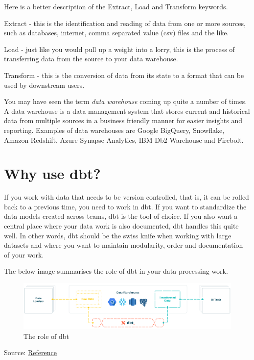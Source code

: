 \documentclass[
]{book}
\begin{document}
Here is a better description of the Extract, Load and Transform keywords.

Extract - this is the identification and reading of data from one or more sources, such as databases, internet, comma separated value (csv) files and the like.

Load - just like you would pull up a weight into a lorry, this is the process of transferring data from the source to your data warehouse.

Transform - this is the conversion of data from its state to a format that can be used by downstream users.

You may have seen the term \emph{data warehouse} coming up quite a number of times. A data warehouse is a data management system that stores current and historical data from multiple sources in a business friendly manner for easier insights and reporting. Examples of data warehouses are Google BigQuery, Snowflake, Amazon Redshift, Azure Synapse Analytics, IBM Db2 Warehouse and Firebolt.

\hypertarget{why-use-dbt}{%
\section{Why use dbt?}\label{why-use-dbt}}

If you work with data that needs to be version controlled, that is, it can be rolled back to a previous time, you need to work in dbt. If you want to standardize the data models created across teams, dbt is the tool of choice. If you also want a central place where your data work is also documented, dbt handles this quite well. In other words, dbt should be the swiss knife when working with large datasets and where you want to maintain modularity, order and documentation of your work.

The below image summarises the role of dbt in your data processing work.

\begin{figure}
\centering
\includegraphics{./images/dbt.png}
\caption{The role of dbt}
\end{figure}

Source: \href{https://www.startdataengineering.com/post/advantages-of-using-dbt-data-build-tool/}{Reference}
\end{document}
